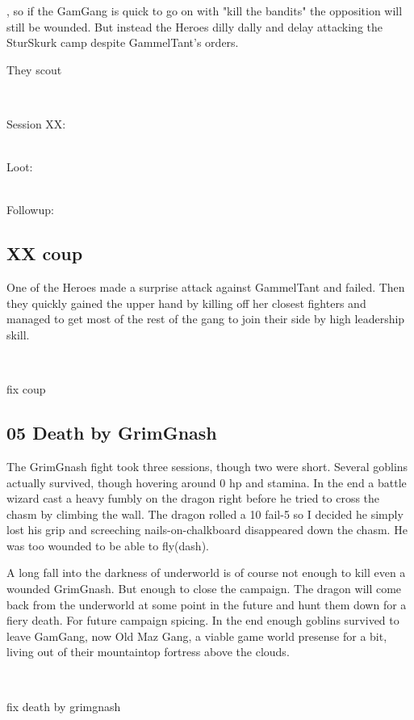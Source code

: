 , so if the GamGang is quick to go on with "kill the bandits" the opposition will still be wounded. But instead the Heroes dilly dally and delay attacking the SturSkurk camp despite GammelTant's orders.


They scout 

\

Session XX:\\

\

Loot:\\

\

Followup:\\






\subsection*{XX coup}

One of the Heroes made a surprise attack against GammelTant and failed. Then they quickly gained the upper hand by killing off her closest fighters and managed to get most of the rest of the gang to join their side by high leadership skill.

\

\TODO fix coup






\subsection*{05 Death by GrimGnash}

The GrimGnash fight took three sessions, though two were short. Several goblins actually survived, though hovering around 0 hp and stamina. In the end a battle wizard cast a heavy fumbly on the dragon right before he tried to cross the chasm by climbing the wall. The dragon rolled a 10 fail-5 so I decided he simply lost his grip and screeching nails-on-chalkboard disappeared down the chasm. He was too wounded to be able to fly(dash).

A long fall into the darkness of underworld is of course not enough to kill even a wounded GrimGnash. But enough to close the campaign. The dragon will come back from the underworld at some point in the future and hunt them down for a fiery death. For future campaign spicing. In the end enough goblins survived to leave GamGang, now Old Maz Gang, a viable game world presense for a bit, living out of their mountaintop fortress above the clouds.

\

\TODO fix death by grimgnash







